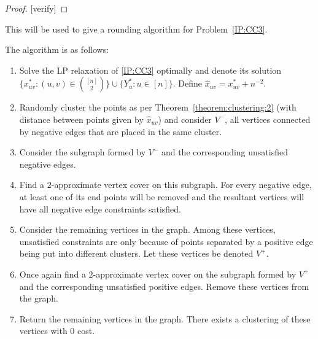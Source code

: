 \begin{proof} {\color{red} [verify]}
\end{proof}

This will be used to give a rounding algorithm for Problem~\ref{IP:CC3}.

\begin{proposition}
The algorithm is as follows:
\begin{enumerate}
    \item Solve the LP relaxation of \ref{IP:CC3} optimally and denote its solution $\{ x_{uv}^* : (u,v) \in \binom{[n]}{2} \} \cup \{ Y_u^* : u \in [n] \}$. Define $\hat{x}_{uv} = x_{uv}^* + n^{-2}$.
    \item Randomly cluster the points as per Theorem~\ref{theorem:clustering:2} (with distance between points given by $\hat{x}_{uv}$) and consider $V^-$, all vertices connected by negative edges that are placed in the same cluster.
    \item Consider the subgraph formed by $V^-$ and the corresponding unsatisfied negative edges.
    \item Find a $2$-approximate vertex cover on this subgraph. For every negative edge, at least one of its end points will be removed and the resultant vertices will have all negative edge constraints satisfied.
    \item Consider the remaining vertices in the graph. Among these vertices, unsatisfied constraints are only because of points separated by a positive edge being put into different clusters. Let these vertices be denoted $V^+$.
    \item Once again find a $2$-approximate vertex cover on the subgraph formed by $V^+$ and the corresponding unsatisfied positive edges. Remove these vertices from the graph.
    \item Return the remaining vertices in the graph. There exists a clustering of these vertices with $0$ cost.
\end{enumerate}
\end{proposition}
